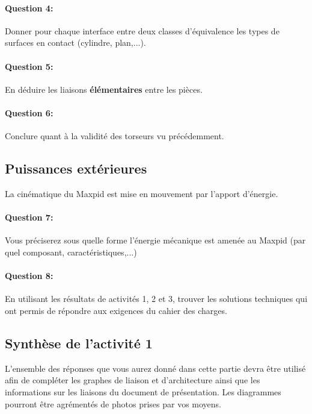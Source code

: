 \paragraph{Question 4:} Donner pour chaque interface entre deux classes d'équivalence les types de surfaces en contact (cylindre, plan,...).

\reponse[3]

\paragraph{Question 5:} En déduire les liaisons \textbf{élémentaires} entre les pièces.

\reponse[3]

\paragraph{Question 6:} Conclure quant à la validité des torseurs vu précédemment.

\reponse[3]

\subsection{Puissances extérieures}

La cinématique du Maxpid est mise en mouvement par l'apport d'énergie.

\paragraph{Question 7:} Vous préciserez sous quelle forme l'énergie mécanique est amenée au Maxpid (par quel composant, caractéristiques,...)

\reponse[3]

\paragraph{Question 8:} En utilisant les résultats de activités 1, 2 et 3, trouver les solutions techniques qui ont permis de répondre aux exigences du cahier des charges.

\subsection{Synthèse de l'activité 1}

L'ensemble des réponses que vous aurez donné dans cette partie devra être utilisé afin de compléter les graphes de liaison et d'architecture ainsi que les informations sur les liaisons du document de présentation. Les diagrammes pourront être agrémentés de photos prises par vos moyens.

